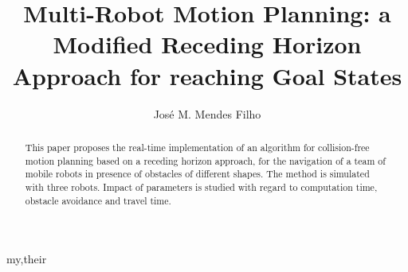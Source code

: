 \documentclass[eprint]{actapoly}
\begin{document}
\title[Trajectory Generation Approach]
{Multi-Robot Motion Planning: a Modified Receding Horizon Approach for reaching Goal States}

\author[J. M. Mendes Filho]{Jos\'{e} M. Mendes Filho}{my,their}


\begin{abstract}


This paper proposes the real-time implementation of an algorithm for collision-free motion planning based on a receding horizon approach, for the navigation of a team of mobile robots in presence of obstacles of different shapes. The method is simulated with three robots. Impact of parameters is studied with regard to computation time, obstacle avoidance and travel time.

 
\end{abstract}


\maketitle
\end{document}
